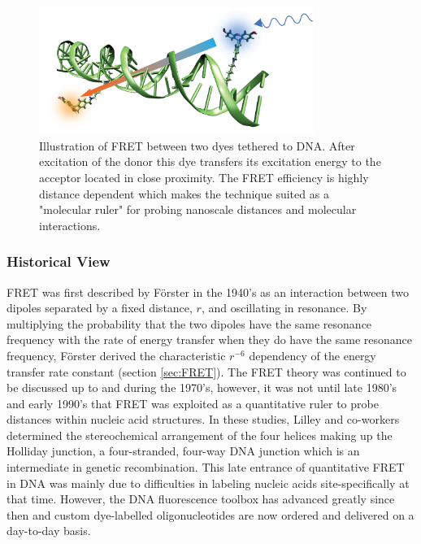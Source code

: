 \begin{figure}
    \centering
        \includegraphics[width=0.8\textwidth]{adds//fret.png}
    \captionsetup{width=.95\textwidth}
    \caption{Illustration of FRET between two dyes tethered to DNA. After excitation of the donor this dye transfers its excitation energy to the acceptor located in close proximity. The FRET efficiency is highly distance dependent which makes the technique suited as a "molecular ruler" for probing nanoscale distances and molecular interactions.}
    \label{Fig:chap_intro_fret}
\end{figure}

\subsubsection{Historical View}
 FRET was first described by Förster in the 1940's as an interaction between two dipoles separated by a fixed distance, $r$, and oscillating in resonance.\cite{Foerster1948} By multiplying the probability that the two dipoles have the same resonance frequency with the rate of energy transfer when they do have the same resonance frequency, Förster derived the characteristic $r^{-6}$ dependency of the energy transfer rate constant (section \ref{sec:FRET}).\cite{Clegg1996} The FRET theory was continued to be discussed up to and during the 1970's\cite{Stryer1967,Dale1974,Dale1979}, however, it was not until late 1980's and early 1990's that FRET was exploited as a quantitative ruler to probe distances within nucleic acid structures.\cite{Murchie1989,Clegg1992b} In these studies, Lilley and co-workers determined the stereochemical arrangement of the four helices making up the Holliday junction, a four-stranded, four-way DNA junction which is an intermediate in genetic recombination. This late entrance of quantitative FRET in DNA was mainly due to difficulties in labeling nucleic acids site-specifically at that time. However, the DNA fluorescence toolbox has advanced greatly since then and custom dye-labelled oligonucleotides are now ordered and delivered on a day-to-day basis.\cite{lifetechnologies,GEHealthcare,GlenResearch,IDT,atdbio}

